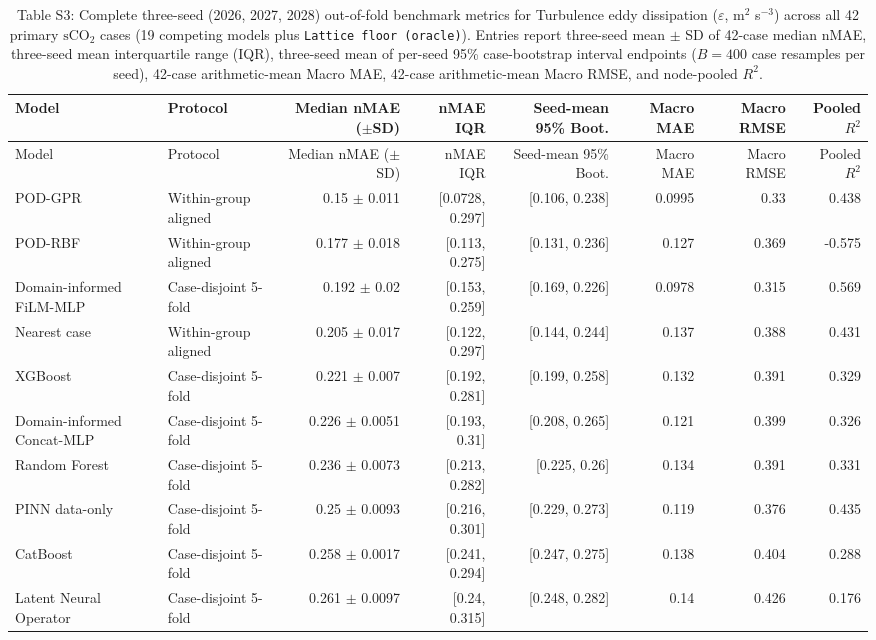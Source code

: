 \begin{landscape}\scriptsize
\begin{longtable}{p{3.8cm}p{2.9cm}rrrrrr}
\caption{Table S3: Complete three-seed (2026, 2027, 2028) out-of-fold benchmark metrics for Turbulence eddy dissipation ($\varepsilon$, m$^2$ s$^{-3}$) across all 42 primary $\mathrm{sCO}_2$ cases (19 competing models plus \texttt{Lattice floor (oracle)}). Entries report three-seed mean $\pm$ SD of 42-case median nMAE, three-seed mean interquartile range (IQR), three-seed mean of per-seed 95\% case-bootstrap interval endpoints ($B=400$ case resamples per seed), 42-case arithmetic-mean Macro MAE, 42-case arithmetic-mean Macro RMSE, and node-pooled $R^2$.}\\
\toprule Model & Protocol & Median nMAE ($\pm$SD) & nMAE IQR & Seed-mean 95\% Boot. & Macro MAE & Macro RMSE & Pooled $R^2$\\
\midrule\endfirsthead
\toprule Model & Protocol & Median nMAE ($\pm$SD) & nMAE IQR & Seed-mean 95\% Boot. & Macro MAE & Macro RMSE & Pooled $R^2$\\
\midrule\endhead
POD-GPR & Within-group aligned & 0.15 $\pm$ 0.011 & [0.0728, 0.297] & [0.106, 0.238] & 0.0995 & 0.33 & 0.438 \\
POD-RBF & Within-group aligned & 0.177 $\pm$ 0.018 & [0.113, 0.275] & [0.131, 0.236] & 0.127 & 0.369 & -0.575 \\
Domain-informed FiLM-MLP & Case-disjoint 5-fold & 0.192 $\pm$ 0.02 & [0.153, 0.259] & [0.169, 0.226] & 0.0978 & 0.315 & 0.569 \\
Nearest case & Within-group aligned & 0.205 $\pm$ 0.017 & [0.122, 0.297] & [0.144, 0.244] & 0.137 & 0.388 & 0.431 \\
XGBoost & Case-disjoint 5-fold & 0.221 $\pm$ 0.007 & [0.192, 0.281] & [0.199, 0.258] & 0.132 & 0.391 & 0.329 \\
Domain-informed Concat-MLP & Case-disjoint 5-fold & 0.226 $\pm$ 0.0051 & [0.193, 0.31] & [0.208, 0.265] & 0.121 & 0.399 & 0.326 \\
Random Forest & Case-disjoint 5-fold & 0.236 $\pm$ 0.0073 & [0.213, 0.282] & [0.225, 0.26] & 0.134 & 0.391 & 0.331 \\
PINN data-only & Case-disjoint 5-fold & 0.25 $\pm$ 0.0093 & [0.216, 0.301] & [0.229, 0.273] & 0.119 & 0.376 & 0.435 \\
CatBoost & Case-disjoint 5-fold & 0.258 $\pm$ 0.0017 & [0.241, 0.294] & [0.247, 0.275] & 0.138 & 0.404 & 0.288 \\
Latent Neural Operator & Case-disjoint 5-fold & 0.261 $\pm$ 0.0097 & [0.24, 0.315] & [0.248, 0.282] & 0.14 & 0.426 & 0.176 \\

\end{longtable}
\end{landscape}
